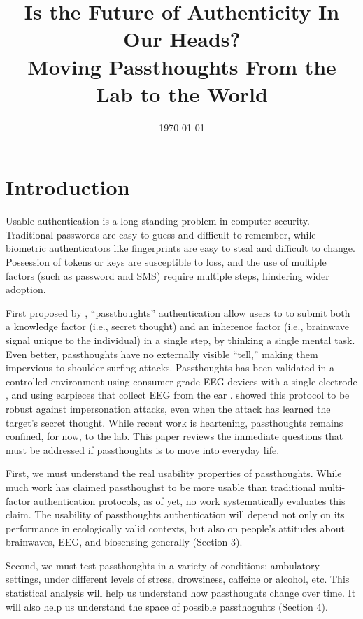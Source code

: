 \documentclass[sigconf]{acmart}
\date{\today}
\title{Is the Future of Authenticity In Our Heads?\\\medskip
\large Moving Passthoughts From the Lab to the World}
\begin{document}
\maketitle

\section{Introduction}
\label{sec:orgad257ec}

Usable authentication is a long-standing problem in computer security.
Traditional passwords are easy to guess and difficult to remember,
while biometric authenticators like fingerprints are easy to steal and difficult to change.
Possession of tokens or keys are susceptible to loss, 
and the use of multiple factors (such as password and SMS) require multiple steps, hindering wider adoption.

First proposed by \cite{Thorpe2005}, ``passthoughts'' authentication allow users to 
to submit both a knowledge factor (i.e., secret thought) and an inherence factor (i.e., brainwave signal unique to the individual) 
in a single step, by thinking a single mental task.
Even better, passthoughts have no externally visible ``tell,'' making them impervious to shoulder surfing attacks.
Passthoughts has been validated in a controlled environment using consumer-grade EEG devices with a single electrode \cite{Chuang2013b}, 
and using earpieces that collect EEG from the ear \cite{curranpassthoughts}.
\cite{Johnson2014} showed this protocol to be robust against impersonation attacks, even when the attack has learned the target's secret thought.
While recent work is heartening, passthoughts remains confined, for now, to the lab.
This paper reviews the immediate questions that must be addressed if passthoughts is to move into everyday life.

First, we must understand the real usability properties of passthoughts.
While much work has claimed passthoughst to be more usable than traditional multi-factor authentication protocols,
as of yet, no work systematically evaluates this claim.
The usability of passthoughts authentication will depend not only on its performance in ecologically valid contexts,
but also on people's attitudes about brainwaves, EEG, and biosensing generally (Section 3).

Second, we must test passthoughts in a variety of conditions: ambulatory settings, under different levels of stress, drowsiness, caffeine or alcohol, etc.
This statistical analysis will help us understand how passthoughts change over time.
It will also help us understand the space of possible passthoguhts (Section 4).
\end{document}
